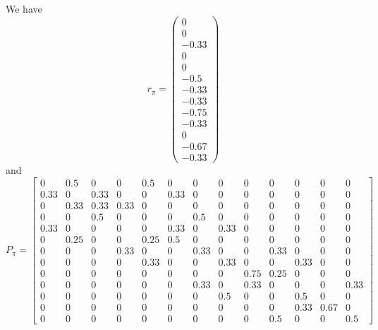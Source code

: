 \documentclass[UTF8]{ctexart}
\begin{document}
	We have
	\begin{equation}
		r_\pi= \begin{pmatrix}
			0\\
			0\\
			-0.33\\
			0\\
			0\\
			-0.5\\
			-0.33\\
			-0.33\\
			-0.75\\
			-0.33\\
			0\\
			-0.67\\
			-0.33
		\end{pmatrix}
	\end{equation}
	and
	\begin{equation}
		P_\pi= \begin{bmatrix}
			0 & 0.5 & 0 & 0 & 0.5 & 0 & 0 & 0 & 0 & 0 & 0 & 0 & 0 \\
			0.33 & 0 & 0.33 & 0 & 0 & 0.33 & 0 & 0 & 0 & 0 & 0 & 0 & 0 \\
			0 & 0.33 & 0.33 & 0.33 & 0 & 0 & 0 & 0 & 0 & 0 & 0 & 0 & 0 \\
			0 & 0 & 0.5 & 0 & 0 & 0 & 0.5 & 0 & 0 & 0 & 0 & 0 & 0 \\
			0.33 & 0 & 0 & 0 & 0 & 0.33 & 0 & 0.33 & 0 & 0 & 0 & 0 & 0 \\
			0 & 0.25 & 0 & 0 & 0.25 & 0.5 & 0 & 0 & 0 & 0 & 0 & 0 & 0\\
			0 & 0 & 0 & 0.33 & 0 & 0 & 0.33 & 0 & 0 & 0.33 & 0 & 0 & 0\\
			0 & 0 & 0 & 0 & 0.33 & 0 & 0 & 0.33 & 0 & 0 & 0.33 & 0 & 0 \\
			0 & 0 & 0 & 0 & 0 & 0 & 0 & 0 & 0.75 & 0.25 & 0 & 0 & 0 \\
			0 & 0 & 0 & 0 & 0 & 0 & 0.33 & 0 & 0.33 & 0 & 0 & 0 & 0.33 \\
			0 & 0 & 0 & 0 & 0 & 0 & 0 & 0.5 & 0 & 0 & 0.5 & 0 & 0 \\
			0 & 0 & 0 & 0 & 0 & 0 & 0 & 0 & 0 & 0 & 0.33 & 0.67 & 0\\
			0 & 0 & 0 & 0 & 0 & 0 & 0 & 0 & 0 & 0.5 & 0 & 0 & 0.5
		\end{bmatrix}
	\end{equation}
\end{document}
